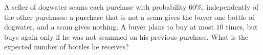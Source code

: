 A seller of dogwater scams each purchase with probability $60\%$, independently of the other purchases: a purchase that is not a scam gives the buyer one bottle of dogwater, and a scam gives nothing. A buyer plans to buy at most $10$ times, but buys again only if he was not scammed on his previous purchase. What is the expected number of bottles he receives?

